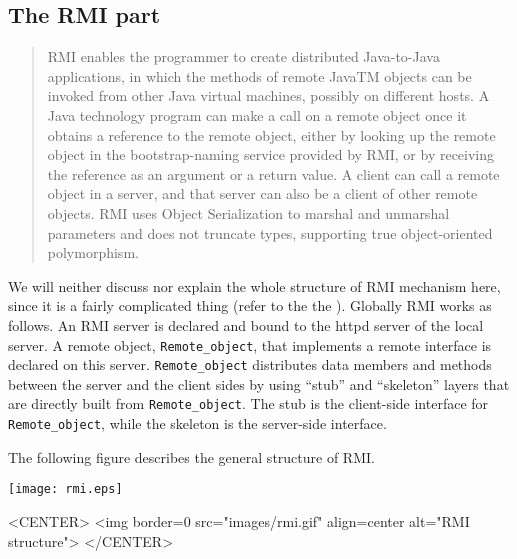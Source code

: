 \subsection{The RMI part}
\label{sec:rmi_part}

\begin{quote}
RMI enables the programmer to create distributed Java-to-Java applications, in 
which the methods of remote JavaTM objects can be invoked from other Java 
virtual machines, possibly on different hosts. A Java technology program can 
make a call on a remote object once it obtains a reference to the remote 
object, either by looking up the remote object in the bootstrap-naming service 
provided by RMI, or by receiving the reference as an argument or a return 
value. A client can call a remote object in a server, and that server can also 
be a client of other remote objects. RMI uses Object Serialization to marshal 
and unmarshal parameters and does not truncate types, supporting true 
object-oriented polymorphism.
\hspace*{\fill}{\em JDK documentation (Javasoft)}
\end{quote}

We will neither discuss nor explain the whole structure of RMI
mechanism here, since it is a fairly complicated thing (refer to the
the ). 
Globally RMI works as follows. An RMI
server is declared and bound to the httpd server of the local
server. A remote object, \texttt{Remote\_object}, that implements a 
remote interface is declared on this server. \texttt{Remote\_object} 
distributes data members 
and methods between the server and the client sides by using
``stub'' and ``skeleton'' layers that are directly built
from \texttt{Remote\_object}. The stub is the client-side interface for
\texttt{Remote\_object}, while the skeleton is the server-side interface.

The following figure describes the general structure of RMI.

\begin{ccTexOnly}
\begin{center}
\texttt{[image: rmi.eps]}
\end{center}
\end{ccTexOnly}
\begin{ccHtmlOnly}
<CENTER>
<img border=0 src="images/rmi.gif" align=center alt="RMI structure"> 
</CENTER>
\end{ccHtmlOnly}

